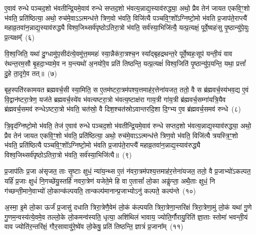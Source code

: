 ए॒वाव॑ रुन्धे पञ्चद॒शो भ॑वतीन्द्रि॒यमे॒वाव॑ रुन्धे सप्तद॒शो भ॑वत्य॒न्नाद्य॒स्याव॑रुद्ध्या॒ अथो॒ प्रैव तेन॑ जायत एकवि॒ꣳ॒शो भ॑वति॒ प्रति॑ष्ठित्या॒ अथो॒ रुच॑मे॒वा\-ऽऽ\-त्मन्ध॑त्ते त्रिण॒वो भ॑वति॒ विजि॑त्यै पञ्चवि॒ꣳ॒शो᳚\-ऽग्निष्टो॒मो भ॑वति प्र॒जा\-प॑ते॒राप्त्यै॑ महाव्र॒तवा॑न॒न्नाद्य॒स्याव॑रुद्ध्यै विश्व॒जिथ्सर्व॑पृष्ठो\-ऽतिरा॒त्रो भ॑वति॒ सर्व॑स्या॒भिजि॑त्यै॒ यत्प्र॒त्यक्षं॒ पूर्वे॒ष्वहः॑सु पृ॒ष्ठान्यु॑पे॒युः प्र॒त्यक्षम्᳚~(६)

वि॒श्व॒जिति॒ यथा॑ दु॒ग्धामु॑प॒सीद॑त्ये॒वमु॑त्त॒ममहः॑ स्या॒न्नैक॑रा॒त्रश्च॒न स्या᳚द्बृहद्रथन्त॒रे पूर्वे॒ष्वहः॒सूप॑ यन्ती॒यं वाव र॑थन्त॒रम॒सौ बृ॒हदा॒भ्यामे॒व न य॒न्त्यथो॑ अ॒नयो॑रे॒व प्रति॑ तिष्ठन्ति॒ यत्प्र॒त्यक्षं॑ विश्व॒जिति॑ पृ॒ष्ठान्यु॑प॒यन्ति॒ यथा॒ प्रत्तां᳚ दु॒हे ता॒दृगे॒व तत्॥~(७)

{\anuvakamend[{तेज॑ उपे॒युः प्र॒त्यक्षं॒ द्विच॑त्वारिꣳशच्च}]}%

बृह॒स्पति॑रकामयत ब्रह्मवर्च॒सी स्या॒मिति॒ स ए॒तम॑ष्टरा॒त्रम॑पश्य॒त्तमाह॑र॒त्तेना॑यजत॒ ततो॒ वै स ब्र॑ह्मवर्च॒स्य॑भव॒द्य ए॒वं वि॒द्वान॑ष्टरा॒त्रेण॒ यज॑ते ब्रह्मवर्च॒स्ये॑व भ॑वत्यष्टरा॒त्रो भ॑वत्य॒ष्टाक्ष॑रा गाय॒त्री गा॑य॒त्री ब्र॑ह्मवर्च॒सम्गा॑यत्रि॒यैव ब्र॑ह्मवर्च॒समव॑ रुन्धे\-ऽष्टरा॒त्रो भ॑वति॒ चत॑स्रो॒ वै दिश॒श्चत॑स्रो\-ऽवान्तरदि॒शा दि॒ग्भ्य ए॒व ब्र॑ह्मवर्च॒समव॑ रुन्धे~(८)

त्रि॒वृद॑ग्निष्टो॒मो भ॑वति॒ तेज॑ ए॒वाव॑ रुन्धे पञ्चद॒शो भ॑वतीन्द्रि॒यमे॒वाव॑ रुन्धे सप्तद॒शो भ॑वत्य॒न्नाद्य॒स्याव॑रुद्ध्या॒ अथो॒ प्रैव तेन॑ जायत एकवि॒ꣳ॒शो भ॑वति॒ प्रति॑ष्ठित्या॒ अथो॒ रुच॑मे॒वा\-ऽऽ\-त्मन्ध॑त्ते त्रिण॒वो भ॑वति॒ विजि॑त्यै त्रयस्त्रि॒ꣳ॒शो भ॑वति॒ प्रति॑ष्ठित्यै पञ्चवि॒ꣳ॒शो᳚\-ऽग्निष्टो॒मो भ॑वति प्र॒जा\-प॑ते॒राप्त्यै॑ महाव्र॒तवा॑न॒न्नाद्य॒स्याव॑रुद्ध्यै विश्व॒जिथ्सर्व॑पृष्ठो\-ऽतिरा॒त्रो भ॑वति॒ सर्व॑स्या॒भिजि॑त्यै॥~(९)

{}%

प्र॒जा\-प॑तिः प्र॒जा अ॑सृजत॒ ताः सृ॒ष्टाः क्षुधं॒ न्या॑य॒न्थ्स ए॒तं न॑वरा॒त्रम॑पश्य॒त्तमाह॑र॒त्तेना॑यजत॒ ततो॒ वै प्र॒जाभ्यो॑\-ऽकल्पत॒ यर्\mbox{}हि॑ प्र॒जाः क्षुधं॑ नि॒गच्छे॑यु॒स्तर्\mbox{}हि॑ नवरा॒त्रेण॑ यजेते॒मे हि वा ए॒तासां᳚ लो॒का अकॢ॑प्ता॒ अथै॒ताः क्षुधं॒ नि ग॑च्छन्ती॒माने॒वाभ्यो॑ लो॒कान्क॑ल्पयति॒ तान्कल्प॑मानान्प्र॒जाभ्यो\-ऽनु॑ कल्पते॒ कल्प॑न्ते~(१०)

अ॒स्मा॒ इ॒मे लो॒का ऊर्जं॑ प्र॒जासु॑ दधाति त्रिरा॒त्रेणै॒वेमं लो॒कं क॑ल्पयति त्रिरा॒त्रेणा॒न्तरि॑क्षं त्रिरा॒त्रेणा॒मुं लो॒कं यथा॑ गु॒णे गु॒णम॒न्वस्य॑त्ये॒वमे॒व तल्लो॒के लो॒कमन्व॑स्यति॒ धृत्या॒ अशि॑थिलं भावाय॒ ज्योति॒र्गौरायु॒रिति॑ ज्ञा॒ताः स्तोमा॑ भवन्ती॒यं वाव ज्योति॑र॒न्तरि॑क्षं॒ गौर॒सावायु॑रे॒ष्वे॑व लो॒केषु॒ प्रति॑ तिष्ठन्ति॒ ज्ञात्रं॑ प्र॒जाना᳚म्~(११)

